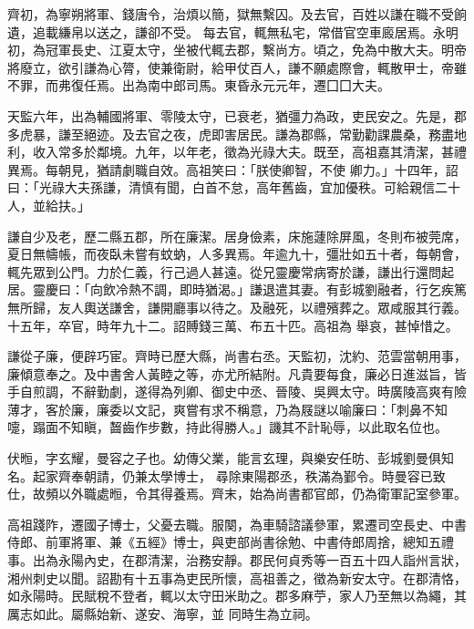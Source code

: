 \begin{pinyinscope}
 齊初，為寧朔將軍、錢唐令，治煩以簡，獄無繫囚。及去官，百姓以謙在職不受餉遺，追載縑帛以送之，謙卻不受。
 每去官，輒無私宅，常借官空車廄居焉。永明初，為冠軍長史、江夏太守，坐被代輒去郡，繫尚方。頃之，免為中散大夫。明帝將廢立，欲引謙為心膂，使兼衛尉，給甲仗百人，謙不願處際會，輒散甲士，帝雖不罪，而弗復任焉。出為南中郎司馬。東昏永元元年，遷囗囗大夫。



 天監六年，出為輔國將軍、零陵太守，已衰老，猶彊力為政，吏民安之。先是，郡多虎暴，謙至絕迹。及去官之夜，虎即害居民。謙為郡縣，常勤勸課農桑，務盡地利，收入常多於鄰境。九年，以年老，徵為光祿大夫。既至，高祖嘉其清潔，甚禮異焉。每朝見，猶請劇職自效。高祖笑曰：「朕使卿智，不使
 卿力。」十四年，詔曰：「光祿大夫孫謙，清慎有聞，白首不怠，高年舊齒，宜加優秩。可給親信二十人，並給扶。」



 謙自少及老，歷二縣五郡，所在廉潔。居身儉素，床施蘧除屏風，冬則布被莞席，夏日無幬帳，而夜臥未嘗有蚊蚋，人多異焉。年逾九十，彊壯如五十者，每朝會，輒先眾到公門。力於仁義，行己過人甚遠。從兄靈慶常病寄於謙，謙出行還問起居。靈慶曰：「向飲冷熱不調，即時猶渴。」謙退遣其妻。有彭城劉融者，行乞疾篤無所歸，友人輿送謙舍，謙開廳事以待之。及融死，以禮殯葬之。眾咸服其行義。十五年，卒官，時年九十二。詔賻錢三萬、布五十匹。高祖為
 舉哀，甚悼惜之。



 謙從子廉，便辟巧宦。齊時已歷大縣，尚書右丞。天監初，沈約、范雲當朝用事，廉傾意奉之。及中書舍人黃睦之等，亦尤所結附。凡貴要每食，廉必日進滋旨，皆手自煎調，不辭勤劇，遂得為列卿、御史中丞、晉陵、吳興太守。時廣陵高爽有險薄才，客於廉，廉委以文記，爽嘗有求不稱意，乃為屐謎以喻廉曰：「刺鼻不知嚏，蹋面不知瞋，齧齒作步數，持此得勝人。」譏其不計恥辱，以此取名位也。



 伏暅，字玄耀，曼容之子也。幼傳父業，能言玄理，與樂安任昉、彭城劉曼俱知名。起家齊奉朝請，仍兼太學博士，
 尋除東陽郡丞，秩滿為鄞令。時曼容已致仕，故頻以外職處暅，令其得養焉。齊末，始為尚書都官郎，仍為衛軍記室參軍。



 高祖踐阼，遷國子博士，父憂去職。服闋，為車騎諮議參軍，累遷司空長史、中書侍郎、前軍將軍、兼《五經》博士，與吏部尚書徐勉、中書侍郎周捨，總知五禮事。出為永陽內史，在郡清潔，治務安靜。郡民何貞秀等一百五十四人詣州言狀，湘州刺史以聞。詔勘有十五事為吏民所懷，高祖善之，徵為新安太守。在郡清恪，如永陽時。民賦稅不登者，輒以太守田米助之。郡多麻苧，家人乃至無以為繩，其厲志如此。屬縣始新、遂安、海寧，並
 同時生為立祠。




\end{pinyinscope}

